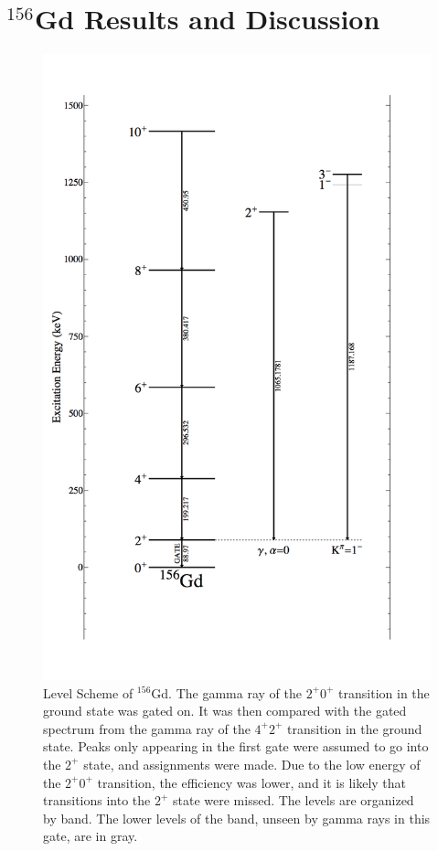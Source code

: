 \chapter{$^{156}$Gd Results and Discussion}


\begin{figure}
    \centering
    \includegraphics[scale=0.3]{156GdTablesAndFigs/156Gd_2to0.png}
    \caption{Level Scheme of $^{156}$Gd. The gamma ray of the $2^+$\rightarrow$0^+$ transition in the ground state was gated on. It was then compared with the gated spectrum from the gamma ray of the $4^+$\rightarrow$2^+$ transition in the ground state. Peaks only appearing in the first gate were assumed to go into the $2^+$ state, and assignments were made. Due to the low energy of the $2^+$\rightarrow$0^+$ transition, the efficiency was lower, and it is likely that transitions into the $2^+$ state were missed. The levels are organized by band. The lower levels of the band, unseen by gamma rays in this gate, are in gray.}
    \label{fig:156_2to0}
\end{figure}

